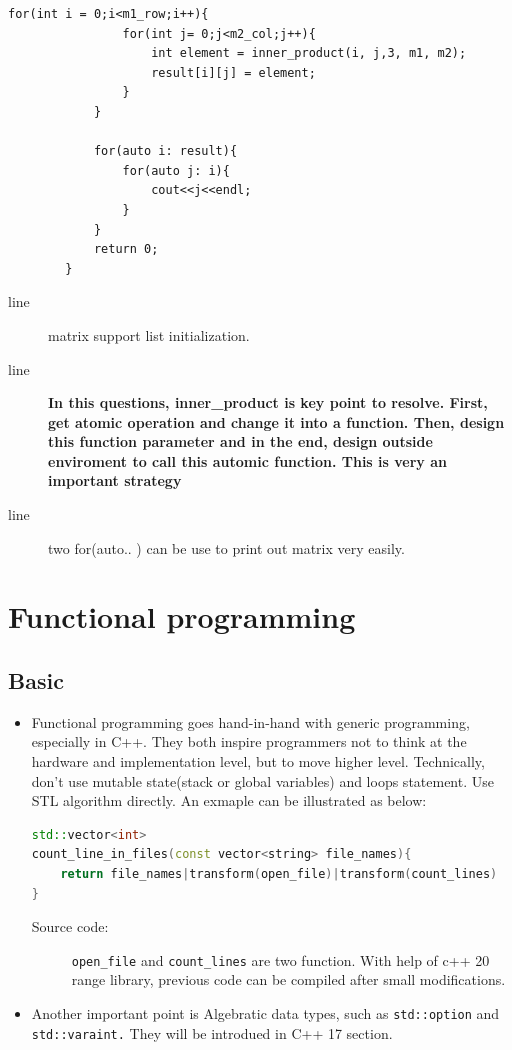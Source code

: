 \documentclass[a4paper,11pt,twoside]{book}
\begin{document}
\begin{itemize}
\begin{lstlisting}[numbers=none]
			for(int i = 0;i<m1_row;i++){
				for(int j= 0;j<m2_col;j++){
					int element = inner_product(i, j,3, m1, m2); 
					result[i][j] = element;
				}
			}
			
			for(auto i: result){
				for(auto j: i){
					cout<<j<<endl;
				}
			}
			return 0;
		}
	\end{lstlisting}
	
	\begin{description}
		\item[line ] matrix support list initialization.
		
		\item[line ] \textbf{In this questions, inner\_product is key point to resolve. First, get atomic operation and change it into a function. Then, design this function parameter and in the end, design outside enviroment to call this automic function. This is very an important strategy} 
		
		\item[line ] two for(auto.. ) can be use to print out matrix very easily.
	\end{description}
	
\end{itemize}


\chapter{Functional programming}

\section{Basic}
\begin{itemize}
	\item Functional programming goes hand-in-hand with generic programming, especially in C++. They both inspire programmers not to think at the hardware and implementation level, but to move higher level. Technically, don't use mutable state(stack or global variables) and loops statement. Use STL algorithm directly. An exmaple can be illustrated as below:
	
	
\begin{lstlisting}[frame=single, language=c++]
std::vector<int>
count_line_in_files(const vector<string> file_names){
	return file_names|transform(open_file)|transform(count_lines)
}
\end{lstlisting}	

\begin{description}
	\item[Source code:] \texttt{open\_file} and \texttt{count\_lines} are two function. With help of c++ 20 range library, previous code can be compiled after small modifications.  
\end{description}
		\item Another important point is Algebratic data types, such as \texttt{std::option} and \texttt{std::varaint.} They will be introdued in C++ 17 section.
\end{itemize}
\end{document}
